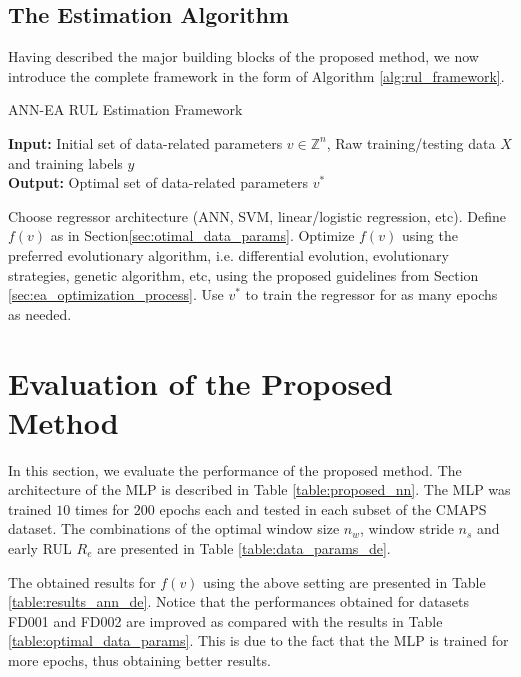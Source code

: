 \documentclass[preprint,12pt]{elsarticle}%
\begin{document}
\subsection{The Estimation Algorithm}

Having described the major building blocks of the proposed method, we now
introduce the complete framework in the form of Algorithm \ref{alg:rul_framework}.

\setcounter{algorithm}{0} 
\begin{algorithm}[H]
\caption{\newline ANN-EA RUL Estimation Framework}\label{alg:rul_framework}
\textbf{Input:} Initial set of data-related parameters $v \in \mathbb{Z}^n$, 
Raw training/testing data $X$ and training labels $y$\\
\textbf{Output:} Optimal set of data-related parameters $v^*$
\begin{algorithmic}[1]
\State Choose regressor architecture (ANN, SVM, linear/logistic regression, etc).
\State Define $f(v)$ as in Section\ref{sec:otimal_data_params}.
\State Optimize $f(v)$ using the preferred evolutionary algorithm, i.e. 
differential evolution, evolutionary strategies, genetic algorithm, etc, using the proposed 
guidelines from Section \ref{sec:ea_optimization_process}.
\State Use $v^*$ to train the regressor for as many epochs as needed.
\end{algorithmic}
\end{algorithm}


\section{Evaluation of the Proposed Method}

\label{sec:rul_eval}

In this section, we evaluate the performance of the proposed method. The
architecture of the MLP is described in Table \ref{table:proposed_nn}. 
The MLP was trained $10$ times for $200$
epochs each and tested in each subset of the CMAPS dataset.
The combinations of the optimal window size $n_{w}$, window
stride $n_{s}$ and early RUL $R_{e}$ are presented in Table
\ref{table:data_params_de}.

The obtained results for $f(v)$ using the above setting are presented in Table
\ref{table:results_ann_de}. Notice that the performances obtained for datasets
FD001 and FD002 are improved as compared with the results 
in Table \ref{table:optimal_data_params}. This is due to the fact that the MLP is trained
for more epochs, thus obtaining better results.
\end{document}
